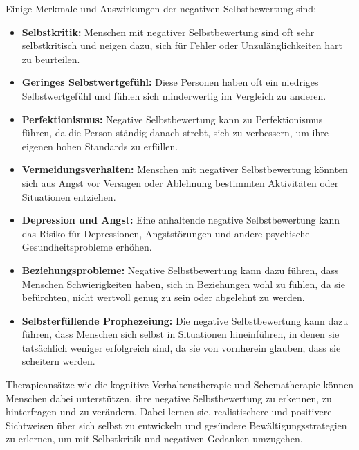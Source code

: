 Einige Merkmale und Auswirkungen der negativen Selbstbewertung sind:
\begin{itemize}
    \item \textbf{Selbstkritik:} Menschen mit negativer Selbstbewertung sind oft sehr selbstkritisch und neigen dazu, sich für Fehler oder Unzulänglichkeiten hart zu beurteilen.
    \item \textbf{Geringes Selbstwertgefühl:} Diese Personen haben oft ein niedriges Selbstwertgefühl und fühlen sich minderwertig im Vergleich zu anderen.
    \item \textbf{Perfektionismus:} Negative Selbstbewertung kann zu Perfektionismus führen, da die Person ständig danach strebt, sich zu verbessern, um ihre eigenen hohen Standards zu erfüllen.
    \item \textbf{Vermeidungsverhalten:} Menschen mit negativer Selbstbewertung könnten sich aus Angst vor Versagen oder Ablehnung bestimmten Aktivitäten oder Situationen entziehen.
    \item \textbf{Depression und Angst:} Eine anhaltende negative Selbstbewertung kann das Risiko für Depressionen, Angststörungen und andere psychische Gesundheitsprobleme erhöhen.
    \item \textbf{Beziehungsprobleme:} Negative Selbstbewertung kann dazu führen, dass Menschen Schwierigkeiten haben, sich in Beziehungen wohl zu fühlen, da sie befürchten, nicht wertvoll genug zu sein oder abgelehnt zu werden.
    \item \textbf{Selbsterfüllende Prophezeiung:} Die negative Selbstbewertung kann dazu führen, dass Menschen sich selbst in Situationen hineinführen, in denen sie tatsächlich weniger erfolgreich sind, da sie von vornherein glauben, dass sie scheitern werden.
\end{itemize}
%
Therapieansätze wie die kognitive Verhaltenstherapie und Schematherapie können Menschen dabei unterstützen, ihre negative Selbstbewertung zu erkennen, zu hinterfragen und zu verändern. Dabei lernen sie, realistischere und positivere Sichtweisen über sich selbst zu entwickeln und gesündere Bewältigungsstrategien zu erlernen, um mit Selbstkritik und negativen Gedanken umzugehen.


